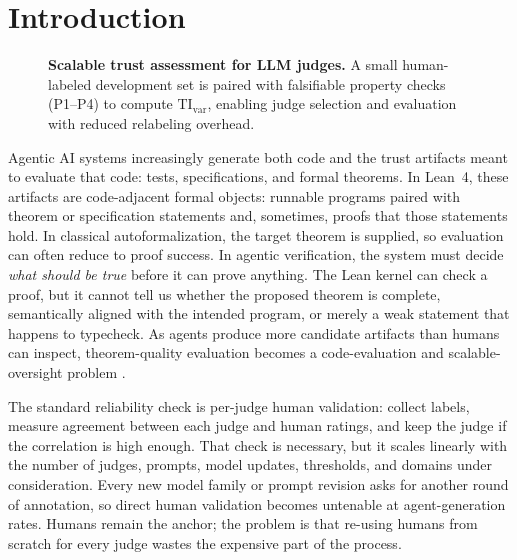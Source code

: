 \documentclass{article}
\begin{document}
\section{Introduction}

\begin{figure}[t]
  \centering
  \resizebox{\linewidth}{!}{}
  \caption{\textbf{Scalable trust assessment for LLM judges.} A small human-labeled development set is paired with falsifiable property checks (P1--P4) to compute \(\mathrm{TI}_{\mathrm{var}}\), enabling judge selection and evaluation with reduced relabeling overhead.}
  \label{fig:certjudge_overview}
\end{figure}

Agentic AI systems increasingly generate both code and the trust artifacts meant to evaluate that code: tests, specifications, and formal theorems.
In Lean~4, these artifacts are code-adjacent formal objects: runnable programs paired with theorem or specification statements and, sometimes, proofs that those statements hold.
In classical autoformalization, the target theorem is supplied, so evaluation can often reduce to proof success.
In agentic verification, the system must decide \emph{what should be true} before it can prove anything.
The Lean kernel can check a proof, but it cannot tell us whether the proposed theorem is complete, semantically aligned with the intended program, or merely a weak statement that happens to typecheck.
As agents produce more candidate artifacts than humans can inspect, theorem-quality evaluation becomes a code-evaluation and scalable-oversight problem \citep{bowman2022scalable,zhou2025graders,khattab2024dspy,cheng2024trace}.

The standard reliability check is per-judge human validation: collect labels, measure agreement between each judge and human ratings, and keep the judge if the correlation is high enough.
That check is necessary, but it scales linearly with the number of judges, prompts, model updates, thresholds, and domains under consideration.
Every new model family or prompt revision asks for another round of annotation, so direct human validation becomes untenable at agent-generation rates.
Humans remain the anchor; the problem is that re-using humans from scratch for every judge wastes the expensive part of the process.

\end{document}
